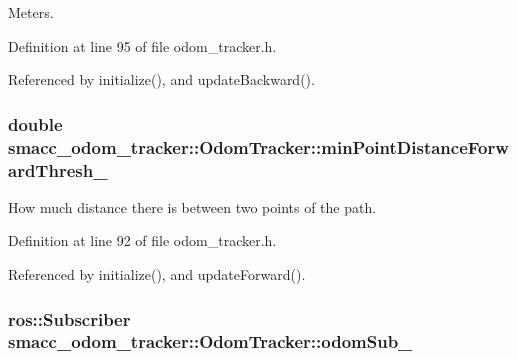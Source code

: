 Meters. 



Definition at line 95 of file odom\+\_\+tracker.\+h.



Referenced by initialize(), and update\+Backward().

\subsubsection[{\texorpdfstring{min\+Point\+Distance\+Forward\+Thresh\+\_\+}{minPointDistanceForwardThresh_}}]{\setlength{\rightskip}{0pt plus 5cm}double smacc\+\_\+odom\+\_\+tracker\+::\+Odom\+Tracker\+::min\+Point\+Distance\+Forward\+Thresh\+\_\+\hspace{0.3cm}{\ttfamily [protected]}}\hypertarget{classsmacc__odom__tracker_1_1OdomTracker_a0017d7740d99c2cc8ba946495b96ce41}{}\label{classsmacc__odom__tracker_1_1OdomTracker_a0017d7740d99c2cc8ba946495b96ce41}


How much distance there is between two points of the path. 



Definition at line 92 of file odom\+\_\+tracker.\+h.



Referenced by initialize(), and update\+Forward().

\subsubsection[{\texorpdfstring{odom\+Sub\+\_\+}{odomSub_}}]{\setlength{\rightskip}{0pt plus 5cm}ros\+::\+Subscriber smacc\+\_\+odom\+\_\+tracker\+::\+Odom\+Tracker\+::odom\+Sub\+\_\+\hspace{0.3cm}{\ttfamily [protected]}}\hypertarget{classsmacc__odom__tracker_1_1OdomTracker_a901bd60f4c1d21537a160d034ff504ef}{}\label{classsmacc__odom__tracker_1_1OdomTracker_a901bd60f4c1d21537a160d034ff504ef}


